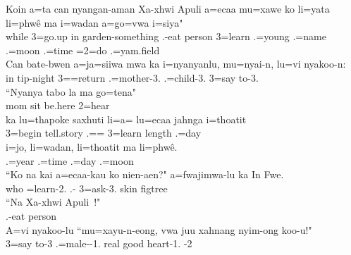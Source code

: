 \ea
\gll Koin a=ta can nyangan-aman Xa-xhwi Apuli a=ecaa mu=xawe ko li=yata li=phwê ma i=wadan a=go=vwa i=siya"\\ while 3=go.up in garden-something .-eat person 3=learn .=young  .=name .=moon  .=time =2=do .=yam.field\\ \glt  {}
\ex
\gll Can bate-bwen a=ja=siiwa mwa ka i=nyanyanlu, mu=nyai-n, lu=vi nyakoo-n:\\ in tip-night 3==return   .=mother-3. .=child-3. 3=say to-3.\\ \glt {}
\ex
\gll ``Nyanya tabo la ma go=tena"\\ mom sit be.here  2=hear\\ \glt  {}
\ex
\gll ka lu=thapoke saxhuti li=a= lu=ecaa jahnga i=thoatit\\  3=begin tell.story .== 3=learn length .=day\\ \glt  {}
\ex
\gll i=jo, li=wadan, li=thoatit ma li=phwê.\\ .=year .=time .=day  .=moon\\ \glt {}
\ex
\gll ``Ko na kai a=ecaa-kau ko nien-aen?" a=fwajimwa-lu ka In Fwe.\\   who =learn-2.  .- 3=ask-3.  skin figtree\\ \glt  {}
\ex\largerpage
\gll ``Na Xa-xhwi Apuli !"\\  .-eat person\\ \glt {} 
\ex
\gll A=vi nyakoo-lu ``mu=xayu-n-eong, vwa juu xahnang nyim-ong koo-u!"\\ 3=say to-3 .=male--1.  real good heart-1. -2\\ \glt {}
\z 

